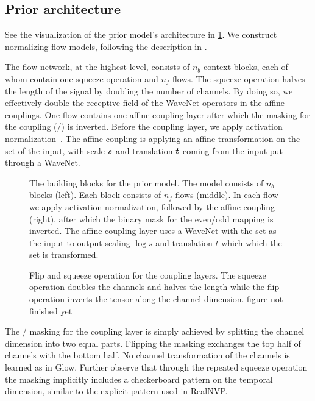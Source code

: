 \subsection{Prior architecture}

See the visualization of the prior model's architecture in \cref{fig:prior_network}. We construct normalizing flow models, following the description in \textcite{kimFloWaveNet2019}.

The flow network, at the highest level, consists of \(n_b\) context blocks, each of whom contain one squeeze operation and \(n_f\) flows. The squeeze operation halves the length of the signal by doubling the number of channels. By doing so, we effectively double the receptive field of the WaveNet operators in the affine couplings. One flow contains one affine coupling layer after which the masking for the coupling (/) is inverted. Before the coupling layer, we apply activation normalization~\cite{kingmaGlow2018}. The affine coupling is applying an affine transformation on the  set of the input, with scale \(\s\) and translation \(\B{t}\) coming from the  input put through a  WaveNet.

\begin{figure}[t]
    
    \caption{The building blocks for the prior model. The model consists of \(n_b\) blocks (left). Each block consists of \(n_f\) flows (middle). In each flow we apply activation normalization, followed by the affine coupling (right), after which the binary mask for the even/odd mapping is inverted. The affine coupling layer uses a WaveNet with the  set as the input to output scaling \(\log s\) and translation \(t\) which which the  set is transformed.}%
    \label{fig:prior_network}
\end{figure}

\begin{figure}
    \hspace*{-25pt}%
    \caption{Flip and squeeze operation for the coupling layers. The squeeze operation doubles the channels and halves the length while the flip operation inverts the tensor along the channel dimension. {\color{orange}figure not finished yet}}%
    \label{fig:squeeze}%
\end{figure}

The / masking for the coupling layer is simply achieved by splitting the channel dimension into two equal parts. Flipping the masking exchanges the top half of channels with the bottom half. No channel transformation of the channels is learned as in Glow. Further observe that through the repeated squeeze operation the masking implicitly includes a checkerboard pattern on the temporal dimension, similar to the explicit pattern used in RealNVP\@.

